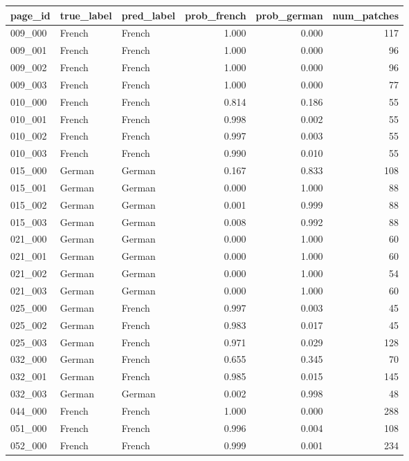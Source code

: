 \begin{tabular}{lllrrr}
\toprule
page_id & true_label & pred_label & prob_french & prob_german & num_patches \\
\midrule
009_000 & French & French & 1.000 & 0.000 & 117 \\
009_001 & French & French & 1.000 & 0.000 & 96 \\
009_002 & French & French & 1.000 & 0.000 & 96 \\
009_003 & French & French & 1.000 & 0.000 & 77 \\
010_000 & French & French & 0.814 & 0.186 & 55 \\
010_001 & French & French & 0.998 & 0.002 & 55 \\
010_002 & French & French & 0.997 & 0.003 & 55 \\
010_003 & French & French & 0.990 & 0.010 & 55 \\
015_000 & German & German & 0.167 & 0.833 & 108 \\
015_001 & German & German & 0.000 & 1.000 & 88 \\
015_002 & German & German & 0.001 & 0.999 & 88 \\
015_003 & German & German & 0.008 & 0.992 & 88 \\
021_000 & German & German & 0.000 & 1.000 & 60 \\
021_001 & German & German & 0.000 & 1.000 & 60 \\
021_002 & German & German & 0.000 & 1.000 & 54 \\
021_003 & German & German & 0.000 & 1.000 & 60 \\
025_000 & German & French & 0.997 & 0.003 & 45 \\
025_002 & German & French & 0.983 & 0.017 & 45 \\
025_003 & German & French & 0.971 & 0.029 & 128 \\
032_000 & German & French & 0.655 & 0.345 & 70 \\
032_001 & German & French & 0.985 & 0.015 & 145 \\
032_003 & German & German & 0.002 & 0.998 & 48 \\
044_000 & French & French & 1.000 & 0.000 & 288 \\
051_000 & French & French & 0.996 & 0.004 & 108 \\
052_000 & French & French & 0.999 & 0.001 & 234 \\
\bottomrule
\end{tabular}
